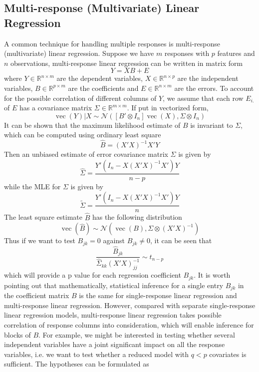 \documentclass[12pt]{article}
\begin{document}
\subsection{Multi-response (Multivariate) Linear Regression} \label{sec:mlr}
A common technique for handling multiple responses is multi-response (multivariate) linear regression. Suppose we have $m$ responses with $p$ features and $n$ observations, multi-response linear regression can be written in matrix form
\begin{equation}
Y=XB+E
\end{equation}
where $Y\in\mathbb{R}^{n\times m}$ are the dependent variables, $X\in\mathbb{R}^{n\times p}$ are the independent variables, $B\in\mathbb{R}^{p\times m}$ are the coefficients and $E\in\mathbb{R}^{n\times m}$ are the errors. To account for the possible correlation of different columns of $Y$, we assume that each row $E_{i.}$ of $E$ has a covariance matrix $\Sigma\in \mathbb{R}^{m\times m}$. If put in vectorized form,
\begin{equation}
\operatorname{vec}(Y)|X\sim \mathcal{N}([B'\otimes I_n]\operatorname{vec}(X),\Sigma \otimes I_n)
\end{equation}
It can be shown that the maximum likelihood estimate of $B$ is invariant to $\Sigma$, which can be computed using ordinary least square
\begin{equation}
\hat{B}=(X'X)^{-1}X'Y
\end{equation}
Then an unbiased estimate of error covariance matrix $\Sigma$ is given by
\begin{equation}
\hat{\Sigma}=\frac{Y'(I_n-X(X'X)^{-1}X')Y}{n-p}
\end{equation}
while the MLE for $\Sigma$ is given by
\begin{equation}
\tilde{\Sigma}=\frac{Y'(I_n-X(X'X)^{-1}X')Y}{n}
\end{equation}
The least square estimate $\hat{B}$ has the following distribution 
\begin{equation}
\operatorname{vec}(\hat{B})\sim \mathcal{N} (\operatorname{vec}(B),\Sigma\otimes(X'X)^{-1})
\end{equation}
Thus if we want to test $B_{jk}=0$ against $B_{jk}\ne0$, it can be seen that
\begin{equation}
\frac{\hat{B}_{jk}}{\hat{\Sigma}_{kk}(X'X)^{-1}_{jj}}\sim t_{n-p}
\end{equation}
which will provide a p value for each regression coefficient $B_{jk}$. It is worth pointing out that mathematically, statistical inference for a single entry $B_{jk}$ in the coefficient matrix $B$ is the same for single-response linear regression and multi-response linear regression. However, compared with separate single-response linear regression models, multi-response linear regression takes possible correlation of response columns into consideration, which will enable inference for blocks of $B$. For example, we might be interested in testing whether several independent variables have a joint significant impact on all the response variables, i.e. we want to test whether a reduced model with $q<p$ covariates is sufficient. The hypotheses can be formulated as
\end{document}

